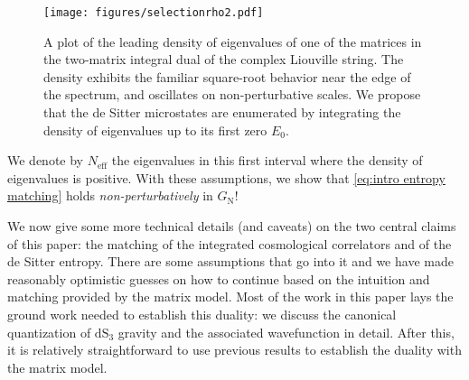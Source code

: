 \documentclass[12pt,a4paper]{article}
\begin{document}
\begin{figure}
    \centering
    \texttt{[image: figures/selectionrho2.pdf]}
    \caption{A plot of the leading density of eigenvalues of one of the matrices in the two-matrix integral dual of the complex Liouville string. The density exhibits the familiar square-root behavior near the edge of the spectrum, and oscillates on non-perturbative scales. We propose that the de Sitter microstates are enumerated by integrating the density of eigenvalues up to its first zero $E_0$. }
    \label{fig:eigenvalue density}
\end{figure}
We denote by $N_\text{eff}$ the eigenvalues in this first interval where the density of eigenvalues is positive. With these assumptions, we show that \eqref{eq:intro entropy matching} holds \emph{non-perturbatively} in $G_\text{N}$! 

\medskip

We now give some more technical details (and caveats) on the two central claims of this paper: the matching of the integrated cosmological correlators and of the de Sitter entropy. There are some assumptions that go into it and we have made reasonably optimistic guesses on how to continue based on the intuition and matching provided by the matrix model. Most of the work in this paper lays the ground work needed to establish this duality: we discuss the canonical quantization of $\mathrm{dS}_3$ gravity and the associated wavefunction in detail. After this, it is relatively straightforward to use previous results \cite{paper2} to establish the duality with the matrix model.
\end{document}
